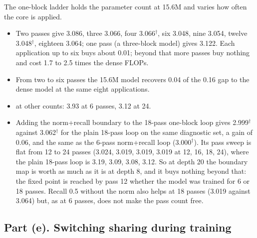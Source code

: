 The one-block ladder holds the parameter count at 15.6M and varies how often the core is applied.
\begin{itemize}
\item {} Two passes give 3.086, three 3.066, four 3.066$^\dagger$, six 3.048, nine 3.054, twelve 3.048$^\dagger$, eighteen 3.064; one pass (a three-block model) gives 3.122. Each application up to six buys about 0.01; beyond that more passes buy nothing and cost 1.7 to 2.5 times the dense FLOPs.
\item {} From two to six passes the 15.6M model recovers 0.04 of the 0.16 gap to the dense model at the same eight applications.
\item {} at other counts: 3.93 at 6 passes, 3.12 at 24.
\item {} Adding the norm+recall boundary to the 18-pass one-block loop gives 2.999$^\dagger$ against 3.062$^\dagger$ for the plain 18-pass loop on the same diagnostic set, a gain of 0.06, and the same as the 6-pass norm+recall loop (3.000$^\dagger$). Its pass sweep is flat from 12 to 24 passes (3.024, 3.019, 3.019, 3.019 at 12, 16, 18, 24), where the plain 18-pass loop is 3.19, 3.09, 3.08, 3.12. So at depth 20 the boundary map is worth as much as it is at depth 8, and it buys nothing beyond that: the fixed point is reached by pass 12 whether the model was trained for 6 or 18 passes. Recall 0.5 without the norm also helps at 18 passes (3.019 against 3.064) but, as at 6 passes, does not make the pass count free.
\end{itemize}

\subsection*{Part (e). Switching sharing during training}

